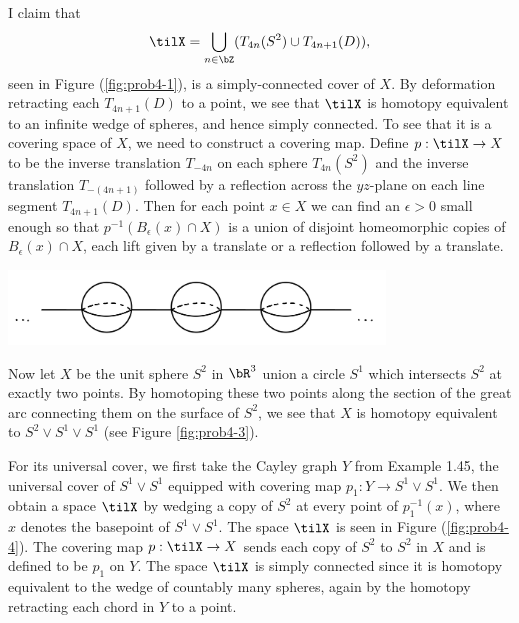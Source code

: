 \begin{homework}[e]
\begin{prf}
    I claim that
    \begin{align*}
      \tilX = \bigcup_{n\in \bZ} (T_{4n}(S^2) \cup T_{4n+1}(D)),
    \end{align*}
    seen in Figure (\ref{fig:prob4-1}), is a simply-connected cover of $X$. By deformation retracting each $T_{4n+1}(D)$ to a point, we see that $\tilX$ is homotopy equivalent to an infinite wedge of spheres, and hence simply connected. To see that it is a covering space of $X$, we need to construct a covering map. Define $p:\tilX\to X$ to be the inverse translation $T_{-4n}$ on each sphere $T_{4n}(S^2)$ and the inverse translation $T_{-(4n+1)}$ followed by a reflection across the $yz$-plane on each line segment $T_{4n+1}(D)$. Then for each point $x \in X$ we can find an $\epsilon > 0$ small enough so that $p^{-1}(B_\epsilon(x)\cap X)$ is a union of disjoint homeomorphic copies of $B_\epsilon(x)\cap X$, each lift given by a translate or a reflection followed by a translate.
    \begin{center}
      \includegraphics[width=10cm]{figures/hwk5-fig4.jpg}
      \label{fig:prob4-1}
    \end{center}

    Now let $X$ be the unit sphere $S^2$ in $\bR^3$ union a circle $S^1$ which intersects $S^2$ at exactly two points. By homotoping these two points along the section of the great arc connecting them on the surface of $S^2$, we see that $X$ is homotopy equivalent to $S^2 \vee S^1\vee S^1$ (see Figure \ref{fig:prob4-3}).

    For its universal cover, we first take the Cayley graph $Y$ from Example 1.45, the universal cover of $S^1\vee S^1$ equipped with covering map $p_1:Y\to S^1\vee S^1$. We then obtain a space $\tilX$ by wedging a copy of $S^2$ at every point of $p_1^{-1}(x)$, where $x$ denotes the basepoint of $S^1\vee S^1$. The space $\tilX$ is seen in Figure (\ref{fig:prob4-4}). The covering map $p:\tilX\to X$ sends each copy of $S^2$ to $S^2$ in $X$ and is defined to be $p_1$ on $Y$. The space $\tilX$ is simply connected since it is homotopy equivalent to the wedge of countably many spheres, again by the homotopy retracting each chord in $Y$ to a point.


\end{prf}
\end{homework}
